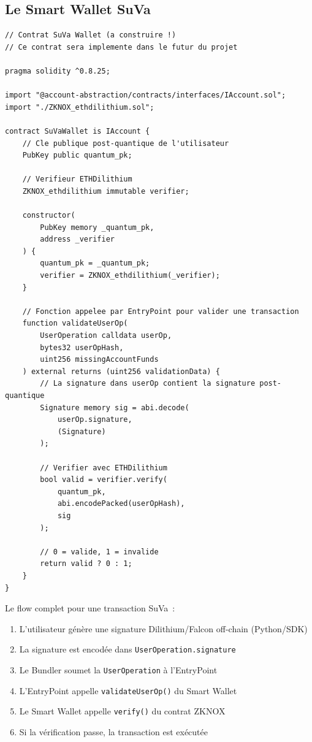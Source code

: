 \documentclass[12pt, a4paper]{article}
\begin{document}
\subsection{Le Smart Wallet SuVa}

\begin{lstlisting}[style=solidity]
// Contrat SuVa Wallet (a construire !)
// Ce contrat sera implemente dans le futur du projet

pragma solidity ^0.8.25;

import "@account-abstraction/contracts/interfaces/IAccount.sol";
import "./ZKNOX_ethdilithium.sol";

contract SuVaWallet is IAccount {
    // Cle publique post-quantique de l'utilisateur
    PubKey public quantum_pk;

    // Verifieur ETHDilithium
    ZKNOX_ethdilithium immutable verifier;

    constructor(
        PubKey memory _quantum_pk,
        address _verifier
    ) {
        quantum_pk = _quantum_pk;
        verifier = ZKNOX_ethdilithium(_verifier);
    }

    // Fonction appelee par EntryPoint pour valider une transaction
    function validateUserOp(
        UserOperation calldata userOp,
        bytes32 userOpHash,
        uint256 missingAccountFunds
    ) external returns (uint256 validationData) {
        // La signature dans userOp contient la signature post-quantique
        Signature memory sig = abi.decode(
            userOp.signature,
            (Signature)
        );

        // Verifier avec ETHDilithium
        bool valid = verifier.verify(
            quantum_pk,
            abi.encodePacked(userOpHash),
            sig
        );

        // 0 = valide, 1 = invalide
        return valid ? 0 : 1;
    }
}
\end{lstlisting}

\begin{importantbox}
Le flow complet pour une transaction SuVa~:
\begin{enumerate}
  \item L'utilisateur génère une signature Dilithium/Falcon off-chain (Python/SDK)
  \item La signature est encodée dans \texttt{UserOperation.signature}
  \item Le Bundler soumet la \texttt{UserOperation} à l'EntryPoint
  \item L'EntryPoint appelle \texttt{validateUserOp()} du Smart Wallet
  \item Le Smart Wallet appelle \texttt{verify()} du contrat ZKNOX
  \item Si la vérification passe, la transaction est exécutée
\end{enumerate}
\end{importantbox}
\end{document}
